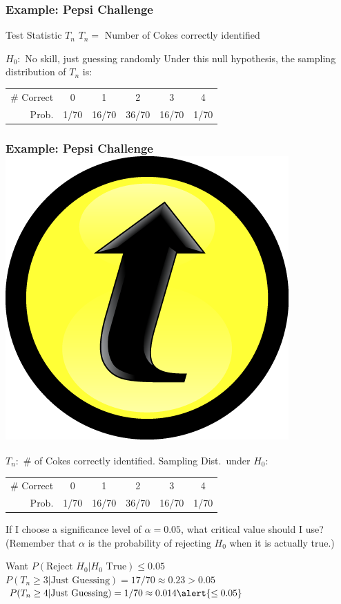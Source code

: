 \documentclass[handout]{beamer}
\begin{document}
\begin{frame}
\frametitle{Example: Pepsi Challenge}
	\begin{block}{Test Statistic $T_n$}
		$T_n =$ Number of Cokes correctly identified
\end{block} 
	\begin{block}{$H_0\colon$ No skill, just guessing randomly}
	Under this null hypothesis, the sampling distribution of $T_n$ is:
		\begin{center}
		\begin{tabular}{rccccc}
		\hline
		\# Correct & 0 & 1 & 2 & 3 & 4\\
		Prob.&1/70 & 16/70 & 36/70 & 16/70 &1/70\\
		\hline
		\end{tabular}
	\end{center}
\end{block}


\end{frame}
\begin{frame}
\frametitle{Example: Pepsi Challenge \hfill \includegraphics[scale = 0.05]{./images/clicker}}
$T_n\colon$ \# of Cokes correctly identified. Sampling Dist.\ under $H_0$:
		\begin{center}
		\begin{tabular}{rccccc}
		\hline
		\# Correct & 0 & 1 & 2 & 3 & 4\\
		Prob.&1/70 & 16/70 & 36/70 & 16/70 &1/70\\
		\hline
		\end{tabular}
	\end{center}
	\alert{If I choose a significance level of $\alpha =0.05$, what critical value should I use?}\\ (Remember that $\alpha$ is the probability of rejecting $H_0$ when it is actually true.)
	\pause
	
	\vspace{2em}
	Want $P(\mbox{Reject } H_0|H_0 \mbox{ True})\leq 0.05$\\ \pause
	$P(T_n \geq 3 |\mbox{Just Guessing}) = 17/70 \approx 0.23 > 0.05$ \pause
	$P(T_n \geq 4 |\mbox{Just Guessing}) = 1/70 \approx 0.014 \alert{\leq 0.05}$ 
\end{frame}
\end{document}
